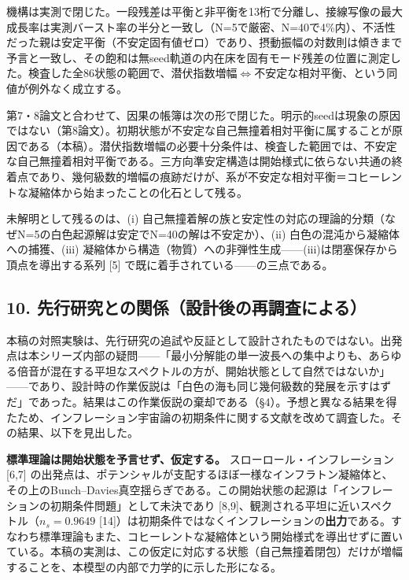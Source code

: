 \documentclass[
  a4paper,
]{ltjsarticle}
\begin{document}
機構は実測で閉じた。一段残差は平衡と非平衡を13桁で分離し、接線写像の最大成長率は実測バースト率の半分と一致し（N=5で厳密、N=40で4\%内）、不活性だった親は安定平衡（不安定固有値ゼロ）であり、摂動振幅の対数則は傾きまで予言と一致し、その飽和は無seed軌道の内在床を固有モード残差の位置に測定した。検査した全86状態の範囲で、潜伏指数増幅\(\iff\)不安定な相対平衡、という同値が例外なく成立する。

第7・8論文と合わせて、因果の帳簿は次の形で閉じた。明示的seedは現象の原因ではない（第8論文）。初期状態が不安定な自己無撞着相対平衡に属することが原因である（本稿）。潜伏指数増幅の必要十分条件は、検査した範囲では、不安定な自己無撞着相対平衡である。三方向準安定構造は開始様式に依らない共通の終着点であり、幾何級数的増幅の痕跡だけが、系が不安定な相対平衡＝コヒーレントな凝縮体から始まったことの化石として残る。

未解明として残るのは、(i)
自己無撞着解の族と安定性の対応の理論的分類（なぜN=5の白色起源解は安定でN=40の解は不安定か）、(ii)
白色の混沌から凝縮体への捕獲、(iii)
凝縮体から構造（物質）への非弾性生成------(iii)は閉塞保存から頂点を導出する系列
{[}5{]} で既に着手されている------の三点である。

\subsection{10.
先行研究との関係（設計後の再調査による）}\label{ux5148ux884cux7814ux7a76ux3068ux306eux95a2ux4fc2ux8a2dux8a08ux5f8cux306eux518dux8abfux67fbux306bux3088ux308b}

本稿の対照実験は、先行研究の追試や反証として設計されたものではない。出発点は本シリーズ内部の疑問------「最小分解能の単一波長への集中よりも、あらゆる倍音が混在する平坦なスペクトルの方が、開始状態として自然ではないか」------であり、設計時の作業仮説は「白色の海も同じ幾何級数的発展を示すはずだ」であった。結果はこの作業仮説の棄却である（§4）。予想と異なる結果を得たため、インフレーション宇宙論の初期条件に関する文献を改めて調査した。その結果、以下を見出した。

\textbf{標準理論は開始状態を予言せず、仮定する。}
スローロール・インフレーション {[}6,7{]}
の出発点は、ポテンシャルが支配するほぼ一様なインフラトン凝縮体と、その上のBunch--Davies真空揺らぎである。この開始状態の起源は「インフレーションの初期条件問題」として未決であり
{[}8,9{]}、観測される平坦に近いスペクトル（\(n_s=0.9649\)
{[}14{]}）は初期条件ではなくインフレーションの\textbf{出力}である。すなわち標準理論もまた、コヒーレントな凝縮体という開始様式を導出せずに置いている。本稿の実測は、この仮定に対応する状態（自己無撞着閉包）だけが増幅することを、本模型の内部で力学的に示した形になる。
\end{document}
